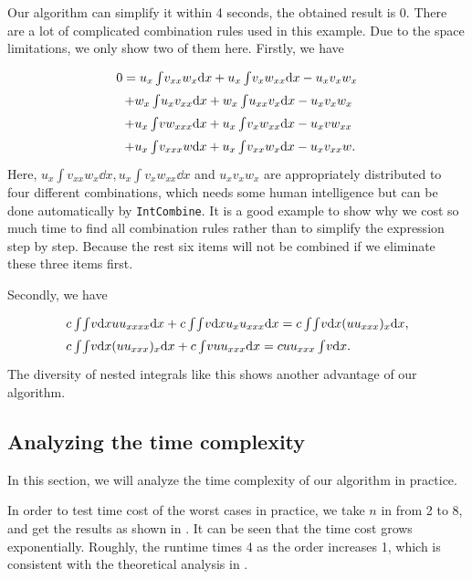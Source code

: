 Our algorithm can simplify it within 4 seconds, the obtained result is 0. There are a lot of complicated combination rules used in this example. Due to the space limitations, we only show two of them here. Firstly, we have 
\begin{equation}
\def\arraystretch{1.5}
\begin{array}{l}
0=u_x\int\!{v_{xx}w_x\dd x}+u_x\int\!{v_xw_{xx}\dd x}-u_xv_xw_x\\
~~+w_x\int\!{u_xv_{xx}\dd x}+w_x\int\!{u_{xx}v_x\dd x}-u_xv_xw_x\\
~~+u_x\int\!{vw_{xxx}\dd x}+u_x\int\!{v_xw_{xx}\dd x}-u_xvw_{xx}\\
~~+u_x\int\!{v_{xxx}w\dd x}+u_x\int\!{v_{xx}w_x\dd x}-u_xv_{xx}w.
\end{array}
\label{counter_example}
\end{equation}
Here, $u_x\int\!{v_{xx}w_x\dd x},u_x\int\!{v_xw_{xx}\dd x}$ and $u_xv_xw_x$ are appropriately distributed to four different combinations, which needs some human intelligence but can be done automatically by \texttt{IntCombine}. It is a good example to show why we cost so much time to find all combination rules rather than to simplify the expression step by step. Because the rest six items will not be combined if we eliminate these three items first. 

Secondly, we have 
\begin{equation}
\def\arraystretch{1.5}
\begin{array}{l}
c\int\!{\int\!{v\dd x}uu_{xxxx}\dd x}+c\int\!{\int\!{v\dd x}u_xu_{xxx}\dd x}=c\int\!{\int\!{v\dd x}(uu_{xxx})_x\dd x},\\
c\int\!{\int\!{v\dd x}(uu_{xxx})_x\dd x}+c\int\!{vuu_{xxx}\dd x}=cuu_{xxx}\int\!{v\dd x}.
\end{array}
\end{equation} 
The diversity of nested integrals like this shows another advantage of our algorithm. 

\subsection{Analyzing the time complexity}\label{sec5.2-03}
In this section, we will analyze the time complexity of our algorithm in practice.

In order to test time cost of the worst cases in practice, we take $n$ in  from 2 to 8, and get the results as shown in . It can be seen that the time cost grows exponentially. Roughly, the runtime times 4 as the order increases 1, which is consistent with the theoretical analysis in . 

